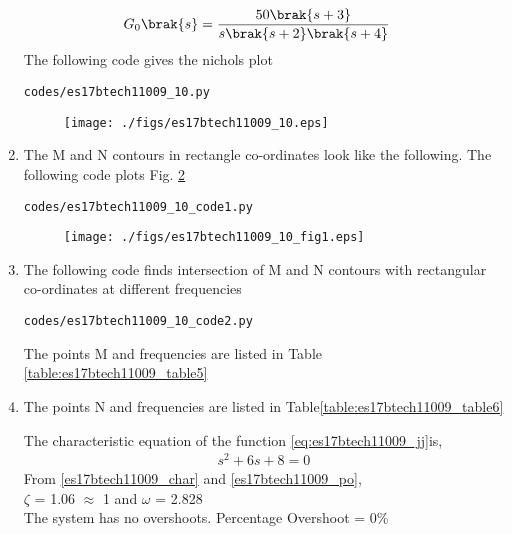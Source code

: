 \begin{enumerate}[label=\thesection.\arabic*.,ref=\thesection.\theenumi]
\begin{align}
G_0\brak{s} &=\frac{50\brak{s+3}}{s\brak{s+2}\brak{s+4}}
\label{eq:es17btech11009_jj}
\end{align}
\solution 
The following code gives the nichols plot
\begin{lstlisting}
codes/es17btech11009_10.py
\end{lstlisting}
\begin{figure}[!h]
\texttt{[image: ./figs/es17btech11009\_10.eps]}
\caption{}
\label{fig:es17btech11009_10}
\end{figure}
\item
The M and N contours in rectangle co-ordinates look like the following.
The following code plots Fig. \ref{fig:es17btech11009_10_1}
\begin{lstlisting}
codes/es17btech11009_10_code1.py
\end{lstlisting}
\begin{figure}[!h]
\texttt{[image: ./figs/es17btech11009\_10\_fig1.eps]}
\caption{}
\label{fig:es17btech11009_10_1}
\end{figure}
\item
The following code finds intersection of M and N contours with rectangular co-ordinates at different frequencies
\begin{lstlisting}
codes/es17btech11009_10_code2.py
\end{lstlisting}
The points M and frequencies are listed in Table  \ref{table:es17btech11009_table5}
\begin{table}[!ht]
\centering

\caption{}
\label{table:es17btech11009_table5}
\end{table}
\item
The points N and frequencies are listed in Table\ref{table:es17btech11009_table6}
\begin{table}[!ht]
\centering

\caption{}
\label{table:es17btech11009_table6}
\end{table}
The characteristic equation of the function \eqref{eq:es17btech11009_jj}is,
\begin{align}
 s^2 + 6s + 8 = 0
 \end{align}
From \eqref{es17btech11009_char} and \eqref{es17btech11009_po},
\\
  $\zeta$ = 1.06 $\approx$ 1 and $\omega$ = 2.828
  \\
  The system has no overshoots.
  Percentage Overshoot = 0\%
\end{enumerate}